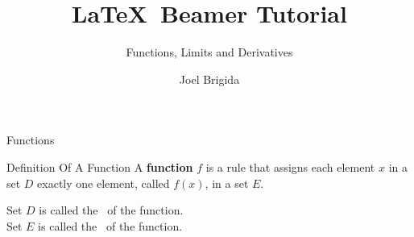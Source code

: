 \documentclass{beamer}
\title{\LaTeX\ Beamer Tutorial}
\subtitle{Functions, Limits and Derivatives}
\author{Joel Brigida}
\institute{Florida Atlantic University}
\date{}
\begin{document}

\begin{frame}
    \titlepage
\end{frame}

\begin{frame}[t]{Functions} \vspace{1cm}
    \begin{block}{Definition Of A Function}
        \vspace{6pt}
        A \textbf{function} $f$ is a rule that assigns each element $x$ in a set $D$ exactly one element, called $f(x)$, in a set $E$.
        \vspace{6pt}
    \end{block}
    \vspace{6pt}
    Set $D$ is called the 
    \, of the function.\\[10pt]

    Set $E$ is called the
    \, of the function.\\[10pt]

\end{frame}
\end{document}
